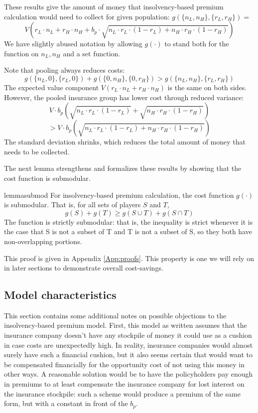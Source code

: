 \documentclass[sigconf]{acmart}
\newcommand{\p}[1]{\left( #1 \right)}
\newcommand{\nL}[0]{\ensuremath{n_L}}
\newcommand{\nH}[0]{\ensuremath{n_H}}
\newcommand{\rL}[0]{\ensuremath{r_L}}
\newcommand{\rH}[0]{\ensuremath{r_H}}
\newcommand{\V}[0]{\ensuremath{V}}
\newcommand{\bp}[0]{\ensuremath{b_p}}
\newcommand{\cost}[0]{\ensuremath{g}}
\newcommand{\cd}[0]{\cdot}
\begin{document}
These results give the amount of money that insolvency-based premium calculation would need to collect for given population: $\cost(\{\nL, \nH\}, \{\rL, \rH\}) = $
$$\V \p{\rL \cd \nL + \rH \cd \nH + \bp \cd \sqrt{\nL \cdot \rL \cd (1-\rL) + \nH \cd \rH \cd (1-\rH)}}$$
We have slightly abused notation by allowing $\cost(\cd)$ to stand both for the function on $\nL, \nH$ and a set function.

Note that pooling always reduces costs: 
$$ \cost(\{\nL, 0\}, \{\rL, 0\}) + \cost(\{0, \nH\}, \{0, \rH\}) > \cost(\{\nL, \nH\}, \{\rL, \rH\})$$
The expected value component $\V \p{\rL \cd \nL + \rH \cd \nH}$ is the same on both sides. However, the pooled insurance group has lower cost through reduced variance: 
$$\V \cd \bp \p{\sqrt{\nL \cdot \rL \cd (1-\rL)} +  \sqrt{\nH \cd \rH \cd (1-\rH)}}$$
$$> \V \cd \bp \p{\sqrt{\nL \cdot \rL \cd (1-\rL) + \nH \cd \rH \cd (1-\rH)}}$$
The standard deviation shrinks, which reduces the total amount of money that needs to be collected. 

The next lemma strengthens and formalizes these results by showing that the cost function is submodular. 

\begin{restatable}{lemma}{submod}
\label{submod}
For insolvency-based premium calculation, the cost function $\cost(\cdot)$ is submodular. That is, for all sets of players $S$ and $T$, 
$$\cost(S) + \cost(T) \geq \cost(S \cup T) + \cost(S \cap T)$$
The function is strictly submodular: that is, the inequality is strict whenever it is the case that S is not a subset of T and T is not a subset of S, so they both have non-overlapping portions. 
\end{restatable}
This proof is given in Appendix \ref{App:proofs}. This property is one we will rely on in later sections to demonstrate overall cost-savings. 

\subsection{Model characteristics}

This section contains some additional notes on possible objections to the insolvency-based premium model. First, this model as written assumes that the insurance company doesn't have any stockpile of money it could use as a cushion in case costs are unexpectedly high. In reality, insurance companies would almost surely have such a financial cushion, but it also seems certain that would want to be compensated financially for the opportunity cost of not using this money in other ways. A reasonable solution would be to have the policyholders pay enough in premiums to at least compensate the insurance company for lost interest on the insurance stockpile: such a scheme would produce a premium of the same form, but with a constant in front of the $\bp$.
\end{document}
